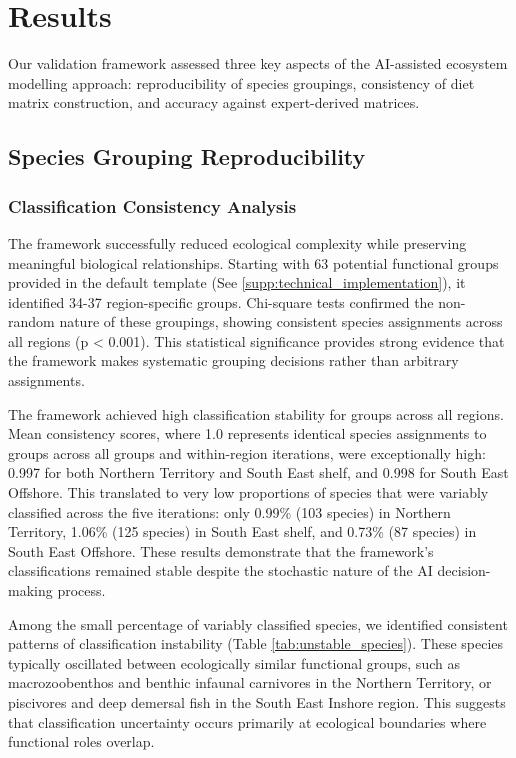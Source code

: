 \section{Results}

Our validation framework assessed three key aspects of the AI-assisted ecosystem modelling approach: reproducibility of species groupings, consistency of diet matrix construction, and accuracy against expert-derived matrices. 

\subsection{Species Grouping Reproducibility}

\subsubsection{Classification Consistency Analysis}
The framework successfully reduced ecological complexity while preserving meaningful biological relationships. Starting with 63 potential functional groups provided in the default template (See \ref{supp:technical_implementation}), it identified 34-37 region-specific groups. Chi-square tests confirmed the non-random nature of these groupings, showing consistent species assignments across all regions (p < 0.001). This statistical significance provides strong evidence that the framework makes systematic grouping decisions rather than arbitrary assignments.

The framework achieved high classification stability for groups across all regions. Mean consistency scores, where 1.0 represents identical species assignments to groups across all groups and within-region iterations, were exceptionally high: 0.997 for both Northern Territory and South East shelf, and 0.998 for South East Offshore. This translated to very low proportions of species that were variably classified across the five iterations: only 0.99\% (103 species) in Northern Territory, 1.06\% (125 species) in South East shelf, and 0.73\% (87 species) in South East Offshore. These results demonstrate that the framework's classifications remained stable despite the stochastic nature of the AI decision-making process.

Among the small percentage of variably classified species, we identified consistent patterns of classification instability (Table \ref{tab:unstable_species}). These species typically oscillated between ecologically similar functional groups, such as macrozoobenthos and benthic infaunal carnivores in the Northern Territory, or piscivores and deep demersal fish in the South East Inshore region. This suggests that classification uncertainty occurs primarily at ecological boundaries where functional roles overlap.

